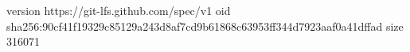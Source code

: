 version https://git-lfs.github.com/spec/v1
oid sha256:90cf41f19329c85129a243d8af7cd9b61868c63953ff344d7923aaf0a41dffad
size 316071
